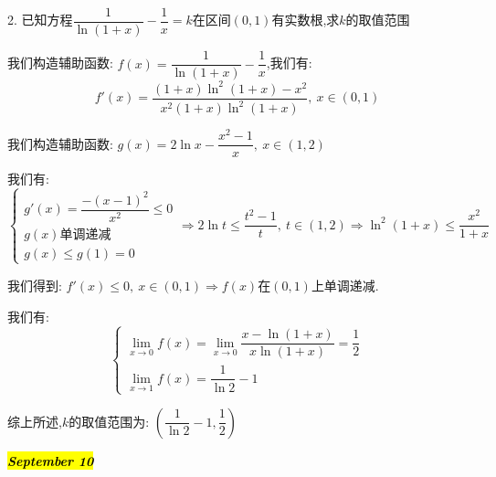 2. 已知方程$\dfrac{1}{\ln(1+x)}-\dfrac{1}{x}=k$在区间$(0,1)$有实数根,求$k$的取值范围
\begin{solution}

	我们构造辅助函数:  $f(x)=\dfrac{1}{\ln(1+x)}-\dfrac{1}{x}$,我们有:  
	$$f'(x)=\dfrac{(1+x)\ln^2(1+x)-x^2}{x^2(1+x)\ln^2(1+x)},\ x\in(0,1)$$
	
	我们构造辅助函数:  $g(x)=2\ln x-\dfrac{x^2-1}{x},\ x\in(1,2)$
	
	我们有:  
	$$\left\lbrace
	\begin{array}{l}
		g'(x)=\dfrac{-(x-1)^2}{x^2}\leq 0\\
		g(x)\text{单调递减}\\
		g(x)\leq g(1)=0
	\end{array}
	\right. \Rightarrow 2\ln t\leq \dfrac{t^2-1}{t},\ t\in(1,2)\Rightarrow \ln^2(1+x)\leq \dfrac{x^2}{1+x}$$
	
	我们得到:  $f'(x)\leq 0,\ x\in(0,1)\Rightarrow f(x)$在$(0,1)$上单调递减.
	
	我们有:  $$\left\lbrace
	\begin{array}{l}
		\lim\limits_{x\rightarrow 0}f(x)=\lim\limits_{x\rightarrow 0}\dfrac{x-\ln(1+x)}{x\ln(1+x)}=\dfrac{1}{2}\\
		\lim\limits_{x\rightarrow 1}f(x)=\dfrac{1}{\ln 2}-1
	\end{array}
	\right. $$
	
	综上所述,$k$的取值范围为:  $(\dfrac{1}{\ln2}-1,\dfrac{1}{2})$
\end{solution}

\hl{\textbf{\textit{September 10}}}

